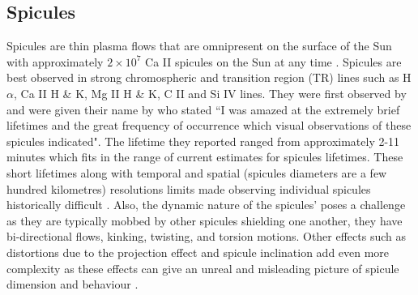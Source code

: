 \documentclass[12pt]{ociamthesis}
\newcommand{\np}{\\ \\}
\begin{document}
\subsection{Spicules}
\label{subsec:Spicules}
Spicules are thin plasma flows that are omnipresent on the surface of the Sun with approximately $2 \times 10^{7}$ Ca II spicules on the Sun at any time \citep{Judge_2010ApJ}. Spicules are best observed in strong chromospheric and transition region (TR) lines such as H$\alpha$, Ca II H \& K, Mg II H \& K, C II and Si IV lines. They were first observed by \cite{Secchi1877} and were given their name by \cite{Roberts1945ApJ} who stated ``I was amazed at the extremely brief lifetimes and the great frequency of occurrence which visual observations of these spicules indicated". The lifetime they reported ranged from approximately 2-11 minutes which fits in the range of current estimates for spicules lifetimes. These short lifetimes along with temporal and spatial (spicules diameters are a few hundred kilometres) resolutions limits made observing individual spicules historically difficult \citep{Sterling_2000SoPh}. Also, the dynamic nature of the spicules' poses a challenge as they are typically mobbed by other spicules shielding one another, they have bi-directional flows, kinking, twisting, and torsion motions. Other effects such as distortions due to the projection effect and spicule inclination add even more complexity as these effects can give an unreal and misleading picture of spicule dimension and behaviour \citep{Porfir2016A}. \np
%
\end{document}
